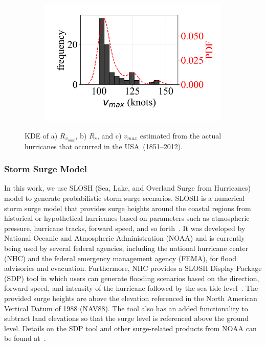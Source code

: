 \begin{figure}[ht]
\begin{subfigure}[t]{0.55\textwidth}
        \includegraphics[clip, trim=0cm 0.7cm 0.1cm 0.5cm,width=\linewidth]{figures/Wm_kde.png}
        \caption{}
    \end{subfigure}
    \hspace*{\fill}
    \vspace{-10pt}
    \caption{KDE of a) $R_{v_{max}}$, b) $R_s$, and c) $v_{max}$ estimated from the actual hurricanes that occurred in the USA~(1851--2012).} 
    \label{fig:three graphs}
\end{figure}

\subsubsection{Storm Surge Model}
In this work, we use SLOSH (Sea, Lake, and Overland Surge from Hurricanes) model to generate probabilistic storm surge scenarios. SLOSH is a numerical storm surge model that provides surge heights around the coastal regions from historical or hypothetical hurricanes based on parameters such as atmospheric pressure, hurricane tracks, forward speed, and so forth~\cite{glahn2009role}. It was developed by National Oceanic and Atmospheric Administration (NOAA) and is currently being used by several federal agencies, including the national hurricane center (NHC) and the federal emergency management agency (FEMA), for flood advisories and evacuation. Furthermore, NHC provides a SLOSH Display Package (SDP) tool in which users can generate flooding scenarios based on the direction, forward speed, and intensity of the hurricane followed by the sea tide level~\cite{SDP}. The provided surge heights are above the elevation referenced in the North American Vertical Datum of 1988 (NAV88). The tool also has an added functionality to subtract land elevations so that the surge level is referenced above the ground level. Details on the SDP tool and other surge-related products from NOAA can be found at~\cite{SDP}. 

